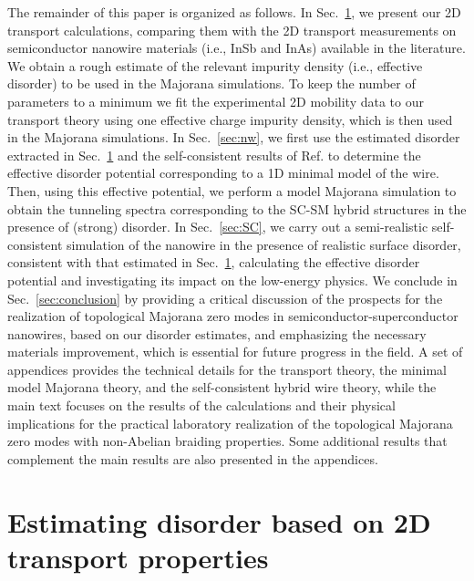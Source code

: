\documentclass[aps,prmaterials,twocolumn,superscriptaddress,longbibliography]{revtex4-2}
\begin{document}
The remainder of this paper is organized as follows.  In Sec.~\ref{sec:transport}, we present our 2D transport calculations, comparing them with the 2D transport measurements on semiconductor nanowire materials (i.e., InSb and InAs) available in the literature. We obtain a rough estimate of the relevant impurity density (i.e., effective disorder) to be used in the Majorana simulations.  To keep the number of parameters to a minimum we fit the experimental 2D mobility data to our transport theory using one effective charge impurity density, which is then used in the Majorana simulations.  In Sec.~\ref{sec:nw}, we first use the estimated disorder extracted in Sec.~\ref{sec:transport} and the self-consistent results of Ref.   to determine the effective disorder potential corresponding to a 1D minimal model of the wire. Then, using this effective potential, we perform a  model Majorana simulation to obtain the tunneling spectra corresponding to the SC-SM hybrid structures in the presence of (strong) disorder.  In Sec.~\ref{sec:SC}, we carry out a semi-realistic self-consistent simulation of the nanowire in the presence of realistic surface disorder, consistent with that estimated in Sec.~\ref{sec:transport},  calculating the effective disorder potential and investigating its impact on the low-energy physics. 
We conclude in Sec.~\ref{sec:conclusion} by providing a critical discussion of the prospects for the realization of topological Majorana zero modes in semiconductor-superconductor nanowires, based on our disorder estimates, and emphasizing the necessary materials improvement, which is essential for future progress in the field.  A set of appendices provides the technical details for the transport theory, the minimal model Majorana theory, and the self-consistent hybrid wire theory, while the main text focuses on the results of the calculations and their physical implications for the practical laboratory realization of the topological Majorana zero modes with non-Abelian braiding properties.  Some additional results that complement the main results are also presented in the appendices.


\section{Estimating disorder based on 2D transport properties}\label{sec:transport}
\end{document}
